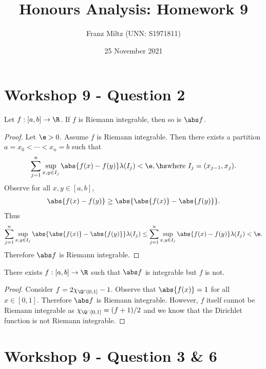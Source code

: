 \documentclass{article}
\begin{document}
\title{Honours Analysis: Homework 9}
\author{Franz Miltz (UNN: S1971811)}
\date{25 November 2021}
\maketitle

\section*{Workshop 9 - Question 2}

\begin{claim*}
   Let $f:[a,b]\to\R$. If $f$ is Riemann integrable, then so is $\abs f$.
\end{claim*}
\begin{proof}
   Let $\e>0$. Assume $f$ is Riemann integrable. Then there exists a partition
   $a=x_0<\cdots<x_n=b$ such that
   \begin{align*}
      \sum_{j=1}^n \sup_{x,y\in I_j} \abs{f(x) - f(y)} \lambda(I_j) < \e,\hs
      \text{where }I_j = (x_{j-1}, x_j).
   \end{align*}
   Observe for all $x,y\in[a,b]$,
   \begin{align*}
      \abs{f(x)-f(y)} \geq \abs{\abs{f(x)} - \abs{f(y)}}.
   \end{align*}
   Thus
   \begin{align*}
      \sum_{j=1}^n \sup_{x,y\in I_j} \abs{\abs{f(x)} - \abs{f(y)}} \lambda(I_j)
      \leq \sum_{j=1}^n \sup_{x,y\in I_j} \abs{f(x) - f(y)} \lambda(I_j) < \e.
   \end{align*}
   Therefore $\abs f$ is Riemann integrable.
\end{proof}

\begin{claim*}
   There exists $f:[a,b]\to\R$ such that $\abs f$ is integrable but $f$ is not.
\end{claim*}
\begin{proof}
   Consider $f = 2\chi_{\Q\cap[0,1]}-1$. Observe that $\abs{f(x)} = 1$ for all $x\in[0,1]$.
   Therefore $\abs f$ is Riemann integrable. However, $f$ itself cannot be Riemann integrable
   as $\chi_{\Q\cap[0,1]} = (f+1)/2$ and we know that the Dirichlet function is not Riemann
   integrable.
\end{proof}

\section*{Workshop 9 - Question 3 \& 6}
\end{document}
